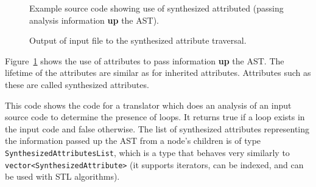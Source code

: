\begin{figure}[!h]
{\indent
{\mySmallFontSize


\begin{latexonly}
   
\end{latexonly}

\begin{htmlonly}
   
\end{htmlonly}

}
}
\caption{Example source code showing use of synthesized attributed (passing analysis
         information {\bf up} the AST).}
\label{Tutorial:exampleSynthesizedAttributeTraversal}
\end{figure}

\begin{figure}[!h]
{\indent
{\mySmallFontSize


\begin{latexonly}
   
\end{latexonly}

\begin{htmlonly}
   
\end{htmlonly}

}
}
\caption{Output of input file to the synthesized attribute traversal.}
\label{Tutorial:exampleOutput_SynthesizedAttributeTraversal}
\end{figure}

  Figure~\ref{Tutorial:exampleSynthesizedAttributeTraversal} shows the use of
attributes to pass information {\bf up} the AST.  The lifetime of the attributes
are similar as for inherited attributes.  Attributes such as these are called
synthesized attributes.  

   This code shows the code for a translator which does an analysis of 
an input source code to determine the presence of loops.  It returns true if
a loop exists in the input code and false otherwise.  The list of synthesized
attributes representing the information passed up the AST from a node's
children is of type {\tt SynthesizedAttributesList}, which is a type that
behaves very similarly to {\tt vector<SynthesizedAttribute>} (it supports
iterators, can be indexed, and can be used with STL algorithms).


